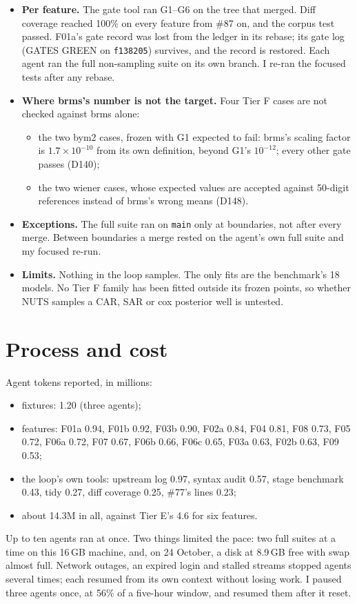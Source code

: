 \documentclass[11pt]{article}
\newcommand{\code}[1]{\texttt{#1}}
\begin{document}
\begin{itemize}
\item \textbf{Per feature.} The gate tool ran G1--G6 on the tree that merged. Diff coverage reached 100\% on every feature
  from \#87 on, and the corpus test passed. F01a's gate record was lost from the ledger in its rebase; its gate log
  (GATES GREEN on \code{f138205}) survives, and the record is restored. Each agent ran the
  full non-sampling suite on its own branch. I re-ran the focused tests after any rebase.
\item \textbf{Where brms's number is not the target.} Four Tier F cases are not checked against brms alone:
  \begin{itemize}
  \item the two bym2 cases, frozen with G1 expected to fail: brms's scaling factor is $1.7\times10^{-10}$ from its own
    definition, beyond G1's $10^{-12}$; every other gate passes (D140);
  \item the two wiener cases, whose expected values are accepted against 50-digit references instead of brms's wrong
    means (D148).
  \end{itemize}
\item \textbf{Exceptions.} The full suite ran on \code{main} only at boundaries, not after every merge. Between
  boundaries a merge rested on the agent's own full suite and my focused re-run.
\item \textbf{Limits.} Nothing in the loop samples. The only fits are the benchmark's 18 models. No Tier F family has been
  fitted outside its frozen points, so whether NUTS samples a CAR, SAR or cox posterior well is untested.
\end{itemize}

\section{Process and cost}

Agent tokens reported, in millions:
\begin{itemize}
\item fixtures: 1.20 (three agents);
\item features: F01a 0.94, F01b 0.92, F03b 0.90, F02a 0.84, F04 0.81, F08 0.73, F05 0.72, F06a 0.72, F07 0.67,
  F06b 0.66, F06c 0.65, F03a 0.63, F02b 0.63, F09 0.53;
\item the loop's own tools: upstream log 0.97, syntax audit 0.57, stage benchmark 0.43, tidy 0.27,
  diff coverage 0.25, \#77's lines 0.23;
\item about 14.3M in all, against Tier E's 4.6 for six features.
\end{itemize}
Up to ten agents ran at once. Two things limited the pace: two full suites at a time on this 16\,GB machine, and, on
24 October, a disk at 8.9\,GB free with swap almost full. Network outages, an expired login and stalled streams stopped
agents several times; each resumed from its own context without losing work. I paused three agents once, at 56\% of a five-hour window, and
resumed them after it reset.
\end{document}
